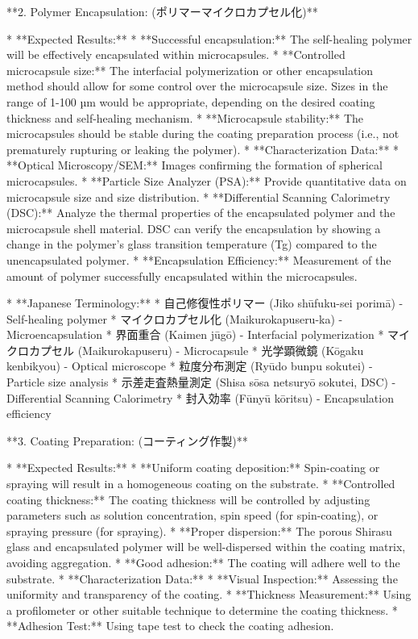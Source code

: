 \documentclass{article}
\begin{document}
**2. Polymer Encapsulation: (ポリマーマイクロカプセル化)**

*   **Expected Results:**
    *   **Successful encapsulation:** The self-healing polymer will be effectively encapsulated within microcapsules.
    *   **Controlled microcapsule size:**  The interfacial polymerization or other encapsulation method should allow for some control over the microcapsule size.  Sizes in the range of 1-100 µm would be appropriate, depending on the desired coating thickness and self-healing mechanism.
    *   **Microcapsule stability:** The microcapsules should be stable during the coating preparation process (i.e., not prematurely rupturing or leaking the polymer).
    *   **Characterization Data:**
        *   **Optical Microscopy/SEM:** Images confirming the formation of spherical microcapsules.
        *   **Particle Size Analyzer (PSA):**  Provide quantitative data on microcapsule size and size distribution.
        *   **Differential Scanning Calorimetry (DSC):**  Analyze the thermal properties of the encapsulated polymer and the microcapsule shell material. DSC can verify the encapsulation by showing a change in the polymer's glass transition temperature (Tg) compared to the unencapsulated polymer.
        *   **Encapsulation Efficiency:** Measurement of the amount of polymer successfully encapsulated within the microcapsules.

*   **Japanese Terminology:**
    *   自己修復性ポリマー (Jiko shūfuku-sei porimā) - Self-healing polymer
    *   マイクロカプセル化 (Maikurokapuseru-ka) - Microencapsulation
    *   界面重合 (Kaimen jūgō) - Interfacial polymerization
    *   マイクロカプセル (Maikurokapuseru) - Microcapsule
    *   光学顕微鏡 (Kōgaku kenbikyou) - Optical microscope
    *   粒度分布測定 (Ryūdo bunpu sokutei) - Particle size analysis
    *   示差走査熱量測定 (Shisa sōsa netsuryō sokutei, DSC) - Differential Scanning Calorimetry
    *   封入効率 (Fūnyū kōritsu) - Encapsulation efficiency

**3. Coating Preparation: (コーティング作製)**

*   **Expected Results:**
    *   **Uniform coating deposition:** Spin-coating or spraying will result in a homogeneous coating on the substrate.
    *   **Controlled coating thickness:** The coating thickness will be controlled by adjusting parameters such as solution concentration, spin speed (for spin-coating), or spraying pressure (for spraying).
    *   **Proper dispersion:** The porous Shirasu glass and encapsulated polymer will be well-dispersed within the coating matrix, avoiding aggregation.
    *   **Good adhesion:** The coating will adhere well to the substrate.
    *   **Characterization Data:**
        *   **Visual Inspection:** Assessing the uniformity and transparency of the coating.
        *   **Thickness Measurement:** Using a profilometer or other suitable technique to determine the coating thickness.
        *   **Adhesion Test:**  Using tape test to check the coating adhesion.
\end{document}
